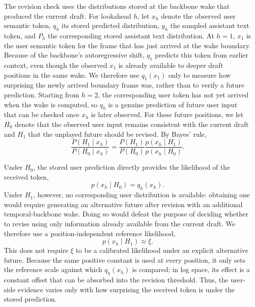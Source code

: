 The revision check uses the distributions stored at the backbone wake that produced the current draft.
For lookahead $h$, let $x_h$ denote the observed user semantic token, $q_h$ its stored predicted distribution, $y_h$ the sampled assistant text token, and $P_h$ the corresponding stored assistant text distribution.
At $h=1$, $x_1$ is the user semantic token for the frame that has just arrived at the wake boundary. Because of the backbone's autoregressive shift, $q_1$ predicts this token from earlier context, even though the observed $x_1$ is already available to deeper draft positions in the same wake. We therefore use $q_1(x_1)$ only to measure how surprising the newly arrived boundary frame was, rather than to verify a future prediction. Starting from $h=2$, the corresponding user token has not yet arrived when the wake is computed, so $q_h$ is a genuine prediction of future user input that can be checked once $x_h$ is later observed. For these future positions, we let $H_0$ denote that the observed user input remains consistent with the current draft and $H_1$ that the unplayed future should be revised.
By Bayes' rule,
\begin{equation}
\frac{P(H_1\mid x_h)}{P(H_0\mid x_h)}
=
\frac{P(H_1)}{P(H_0)}
\frac{p(x_h\mid H_1)}{p(x_h\mid H_0)}.
\label{aeq:revision_bayes_impl}
\end{equation}

Under $H_0$, the stored user prediction directly provides the likelihood of the received token,
\begin{equation}
p(x_h\mid H_0)=q_h(x_h).
\end{equation}
Under $H_1$, however, no corresponding user distribution is available: obtaining one would require generating an alternative future after revision with an additional temporal-backbone wake.
Doing so would defeat the purpose of deciding whether to revise using only information already available from the current draft.
We therefore use a position-independent reference likelihood,
\begin{equation}
p(x_h\mid H_1)\approx\xi.
\end{equation}
This does not require $\xi$ to be a calibrated likelihood under an explicit alternative future.
Because the same positive constant is used at every position, it only sets the reference scale against which $q_h(x_h)$ is compared; in log space, its effect is a constant offset that can be absorbed into the revision threshold.
Thus, the user-side evidence varies only with how surprising the received token is under the stored prediction.

